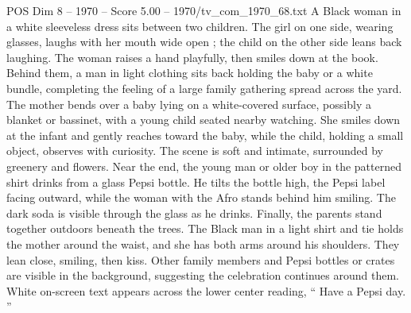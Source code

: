 \begin{textsample}{POS Dim 8 – 1970 – Score 5.00 – 1970/tv\_com\_1970\_68.txt}
A Black woman in a white sleeveless dress sits between two children.
The girl on one side, wearing glasses, laughs with her mouth wide open ; the child on the other side leans back laughing.
The woman raises a hand playfully, then smiles down at the book.
Behind them, a man in light clothing sits back holding the baby or a white bundle, completing the feeling of a large family gathering spread across the yard.
The mother bends over a baby lying on a white-covered surface, possibly a blanket or bassinet, with a young child seated nearby watching.
She smiles down at the infant and gently reaches toward the baby, while the child, holding a small object, observes with curiosity.
The scene is soft and intimate, surrounded by greenery and flowers.
Near the end, the young man or older boy in the patterned shirt drinks from a glass Pepsi bottle.
He tilts the bottle high, the Pepsi label facing outward, while the woman with the Afro stands behind him smiling.
The dark soda is visible through the glass as he drinks.
Finally, the parents stand together outdoors beneath the trees.
The Black man in a light shirt and tie holds the mother around the waist, and she has both arms around his shoulders.
They lean close, smiling, then kiss.
Other family members and Pepsi bottles or crates are visible in the background, suggesting the celebration continues around them.
White on-screen text appears across the lower center reading, “ Have a Pepsi day. ”

\end{textsample}
